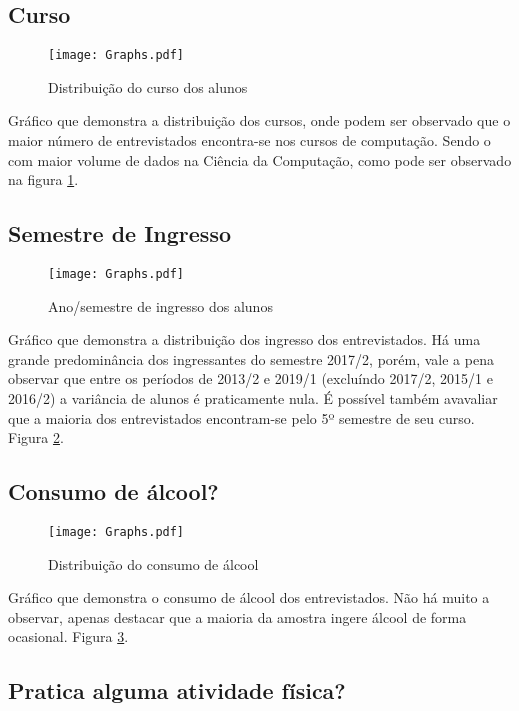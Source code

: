 \documentclass[11pt]{scrartcl} %
\begin{document}
\subsection{Curso}

\begin{figure}[h]
  \centering
  \texttt{[image: Graphs.pdf]}
  \caption{Distribuição do curso dos alunos}
  \label{fig:graph1}
\end{figure}

Gráfico que demonstra a distribuição dos cursos, onde podem ser observado que o maior número de entrevistados encontra-se nos cursos de computação. Sendo o com maior volume de dados na Ciência da Computação, como pode ser observado na figura \ref{fig:graph1}.

\subsection{Semestre de Ingresso}

\begin{figure}[h]
  \centering
  \texttt{[image: Graphs.pdf]}
  \label{fig:graph2}
  \caption{Ano/semestre de ingresso dos alunos}
\end{figure}

Gráfico que demonstra a distribuição dos ingresso dos entrevistados. Há uma grande predominância dos ingressantes do semestre 2017/2, porém, vale a pena observar que entre os períodos de 2013/2 e 2019/1 (excluíndo 2017/2, 2015/1 e 2016/2) a variância de alunos é praticamente nula. É possível também avavaliar que a maioria dos entrevistados encontram-se pelo 5º semestre de seu curso. Figura \ref{fig:graph2}.

\subsection{Consumo de álcool?}

\begin{figure}[h]
  \centering
  \texttt{[image: Graphs.pdf]}
  \label{fig:graph3}
  \caption{Distribuição do consumo de álcool}
\end{figure}

Gráfico que demonstra o consumo de álcool dos entrevistados. Não há muito a observar, apenas destacar que a maioria da amostra ingere álcool de forma ocasional.  Figura \ref{fig:graph3}.

\subsection{Pratica alguma atividade física?}
\end{document}
